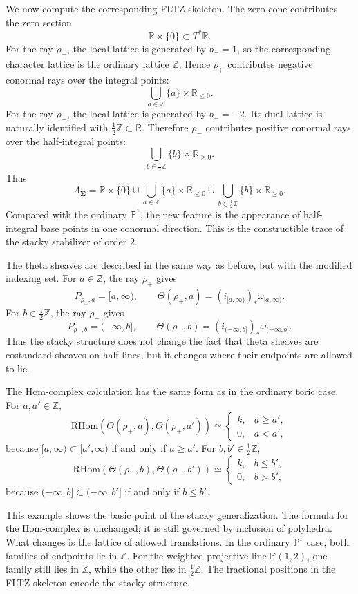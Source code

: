 We now compute the corresponding FLTZ skeleton. The zero cone contributes the
zero section
\[
\mathbb R\times\{0\}\subset T^*\mathbb R.
\]
For the ray \(\rho_+\), the local lattice is generated by \(b_+=1\), so the
corresponding character lattice is the ordinary lattice \(\mathbb Z\). Hence
\(\rho_+\) contributes negative conormal rays over the integral points:
\[
\bigcup_{a\in\mathbb Z}\{a\}\times\mathbb R_{\le 0}.
\]
For the ray \(\rho_-\), the local lattice is generated by \(b_-=-2\). Its dual
lattice is naturally identified with \(\frac{1}{2}\mathbb Z\subset\mathbb R\).
Therefore \(\rho_-\) contributes positive conormal rays over the half-integral
points:
\[
\bigcup_{b\in \frac{1}{2}\mathbb Z}\{b\}\times\mathbb R_{\ge 0}.
\]
Thus
\[
\Lambda_{\boldsymbol\Sigma}
=
\mathbb R\times\{0\}
\cup
\bigcup_{a\in\mathbb Z}\{a\}\times\mathbb R_{\le 0}
\cup
\bigcup_{b\in \frac{1}{2}\mathbb Z}\{b\}\times\mathbb R_{\ge 0}.
\]
Compared with the ordinary \(\mathbb P^1\), the new feature is the appearance
of half-integral base points in one conormal direction. This is the
constructible trace of the stacky stabilizer of order \(2\).

The theta sheaves are described in the same way as before, but with the
modified indexing set. For \(a\in\mathbb Z\), the ray \(\rho_+\) gives
\[
P_{\rho_+,a}=[a,\infty),
\qquad
\Theta(\rho_+,a)
=
(i_{[a,\infty)})_*\omega_{[a,\infty)}.
\]
For \(b\in \frac{1}{2}\mathbb Z\), the ray \(\rho_-\) gives
\[
P_{\rho_-,b}=(-\infty,b],
\qquad
\Theta(\rho_-,b)
=
(i_{(-\infty,b]})_*\omega_{(-\infty,b]}.
\]
Thus the stacky structure does not change the fact that theta sheaves are
costandard sheaves on half-lines, but it changes where their endpoints are
allowed to lie.

The Hom-complex calculation has the same form as in the ordinary toric case.
For \(a,a'\in\mathbb Z\),
\[
\mathrm{RHom}(\Theta(\rho_+,a),\Theta(\rho_+,a'))
\simeq
\begin{cases}
k, & a\ge a',\\
0, & a<a',
\end{cases}
\]
because \([a,\infty)\subset [a',\infty)\) if and only if \(a\ge a'\). For
\(b,b'\in \frac{1}{2}\mathbb Z\),
\[
\mathrm{RHom}(\Theta(\rho_-,b),\Theta(\rho_-,b'))
\simeq
\begin{cases}
k, & b\le b',\\
0, & b>b',
\end{cases}
\]
because \((-\infty,b]\subset(-\infty,b']\) if and only if \(b\le b'\).

This example shows the basic point of the stacky generalization. The formula
for the Hom-complex is unchanged; it is still governed by inclusion of
polyhedra. What changes is the lattice of allowed translations. In the ordinary
\(\mathbb P^1\) case, both families of endpoints lie in \(\mathbb Z\). For the
weighted projective line \(\mathbb P(1,2)\), one family still lies in
\(\mathbb Z\), while the other lies in \(\frac{1}{2}\mathbb Z\). The fractional
positions in the FLTZ skeleton encode the stacky structure.

